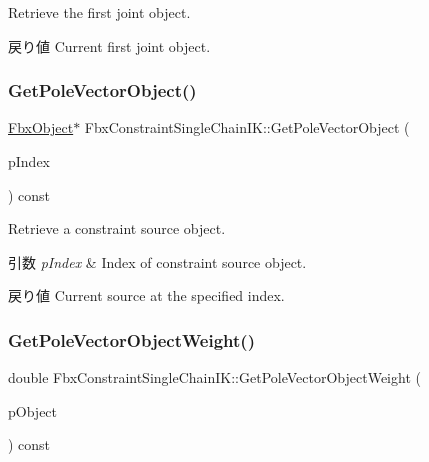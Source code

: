 Retrieve the first joint object. \begin{DoxyReturn}{戻り値}
Current first joint object. 
\end{DoxyReturn}
\mbox{\label{class_fbx_constraint_single_chain_i_k_a59e6ce644cae71cba898be453e74663c}} 
\subsubsection{\texorpdfstring{Get\+Pole\+Vector\+Object()}{GetPoleVectorObject()}}
{\footnotesize\ttfamily \hyperlink{class_fbx_object}{Fbx\+Object}$\ast$ Fbx\+Constraint\+Single\+Chain\+I\+K\+::\+Get\+Pole\+Vector\+Object (\begin{DoxyParamCaption}\item[{int}]{p\+Index }\end{DoxyParamCaption}) const}

Retrieve a constraint source object. 
\begin{DoxyParams}{引数}
{\em p\+Index} & Index of constraint source object. \\
\hline
\end{DoxyParams}
\begin{DoxyReturn}{戻り値}
Current source at the specified index. 
\end{DoxyReturn}
\mbox{\label{class_fbx_constraint_single_chain_i_k_ae212fc88bd99906d8aadcc160dc0c1b8}} 
\subsubsection{\texorpdfstring{Get\+Pole\+Vector\+Object\+Weight()}{GetPoleVectorObjectWeight()}}
{\footnotesize\ttfamily double Fbx\+Constraint\+Single\+Chain\+I\+K\+::\+Get\+Pole\+Vector\+Object\+Weight (\begin{DoxyParamCaption}\item[{const \hyperlink{class_fbx_object}{Fbx\+Object} $\ast$}]{p\+Object }\end{DoxyParamCaption}) const}


